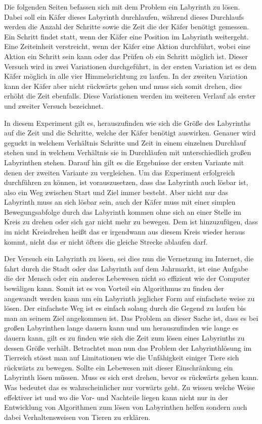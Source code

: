 \documentclass[12pt, a4paper, titlepage]{article}
\begin{document}
Die folgenden Seiten befassen sich mit dem Problem ein Labyrinth zu lösen.
Dabei soll ein Käfer dieses Labyrinth durchlaufen, während dieses Durchlaufs werden die Anzahl der Schritte sowie die Zeit die der Käfer benötigt gemessen.
Ein Schritt findet statt, wenn der Käfer eine Position im Labyrinth weitergeht.
Eine Zeiteinheit verstreicht, wenn der Käfer eine Aktion durchführt, wobei eine Aktion ein Schritt sein kann oder das Prüfen ob ein Schritt möglich ist.
Dieser Versuch wird in zwei Variationen durchgeführt, in der ersten Variation ist es dem Käfer möglich in alle vier Himmelsrichtung zu laufen.
In der zweiten Variation kann der Käfer aber nicht rückwärts gehen und muss sich somit drehen, dies erhöht die Zeit ebenfalls.
Diese Variationen werden im weiteren Verlauf als erster und zweiter Versuch bezeichnet.

\bigskip

In diesem Experiment gilt es, herauszufinden wie sich die Größe des Labyrinths auf die Zeit und die Schritte, welche der Käfer benötigt auswirken.
Genauer wird geguckt in welchem Verhältnis Schritte und Zeit in einem einzelnen Durchlauf stehen und in welchem Verhältnis sie in Durchläufen mit unterschiedlich großen Labyrinthen stehen.
Darauf hin gilt es die Ergebnisse der ersten Variante mit denen der zweiten Variante zu vergleichen.
Um das Experiment erfolgreich durchführen zu können, ist vorauszusetzen, dass das Labyrinth auch lösbar ist, also ein Weg zwischen Start und Ziel immer besteht.
Aber nicht nur das Labyrinth muss an sich lösbar sein, auch der Käfer muss mit einer simplen Bewegungsabfolge durch das Labyrinth kommen ohne sich an einer Stelle im Kreis zu drehen oder sich gar nicht mehr zu bewegen.
Dem ist hinzuzufügen, dass im nicht Kreisdrehen heißt das er irgendwann aus diesem Kreis wieder heraus kommt, nicht das er nicht öfters die gleiche Strecke ablaufen darf.

\bigskip

Der Versuch ein Labyrinth zu lösen, sei dies nun die Vernetzung im Internet, die fahrt durch die Stadt oder das Labyrinth auf dem Jahrmarkt, ist eine Aufgabe die der Mensch oder ein anderes Lebewesen nicht so effizient wie der Computer bewäligen kann.
Somit ist es von Vorteil ein Algorithmus zu finden der angewandt werden kann um ein Labyrinth jeglicher Form auf einfachste weise zu lösen. 
Der einfachste Weg ist es einfach solang durch die Gegend zu laufen bis man an seinem Ziel angekommen ist.
Das Problem an dieser Sache ist, dass es bei großen Labyrinthen lange dauern kann und um herauszufinden wie lange es dauern kann, gilt es zu finden wie sich die Zeit zum lösen eines Labyrinths zu dessen Größe verhält.
Betrachtet man nun das Problem der Labyrinthlösung im Tierreich stösst man auf Limitationen wie die Unfähigkeit einiger Tiere sich rückwärts zu bewegen. Sollte ein Lebewesen mit dieser Einschränkung ein Labyrinth lösen müssen. Muss es sich erst drehen, bevor es rückwärts gehen kann. Was bedeutet das es wahrscheinlicher nur vorwärts geht. Zu wissen welche Weise effektiver ist und wo die Vor- und Nachteile liegen kann nicht nur in der Entwicklung von Algorithmen zum lösen von Labyrinthen helfen sondern auch dabei Verhaltensweisen von Tieren zu erklären.
\end{document}
